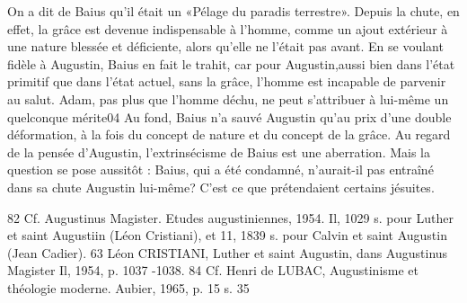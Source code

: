 On a dit de Baius qu'il était un «Pélage  du  paradis  terrestre». Depuis la chute, en effet, la grâce est devenue indispensable à l'homme, comme un ajout extérieur à une nature blessée et déficiente, alors qu'elle ne l'était pas avant. En se voulant fidèle à Augustin, Baius en fait le trahit, car pour Augustin,aussi bien dans l'état primitif que dans l'état actuel, sans la grâce, l'homme est incapable de parvenir au salut. Adam, pas plus que l'homme déchu, ne peut s'attribuer à lui-même un quelconque mérite04  	Au fond, Baius n'a sauvé Augustin qu'au prix d'une double déformation, à la fois du concept de nature et du concept de la grâce. Au regard de la pensée d'Augustin, l'extrinsécisme de Baius est une aberration. Mais la question se pose aussitôt : Baius, qui a été condamné, n'aurait-il pas entraîné dans sa chute Augustin lui-même? C'est ce que prétendaient certains jésuites.

82 Cf. Augustinus Magister. Etudes augustiniennes, 1954. Il, 1029 s. pour Luther et saint Augustiin (Léon Cristiani), et 11, 1839 s. pour Calvin et saint Augustin (Jean Cadier).
63 Léon CRISTIANI, Luther et saint Augustin, dans Augustinus Magister Il, 1954, p. 1037 -1038.
84 Cf. Henri de LUBAC, Augustinisme et théologie moderne. Aubier, 1965, p. 15 s.
35
 
